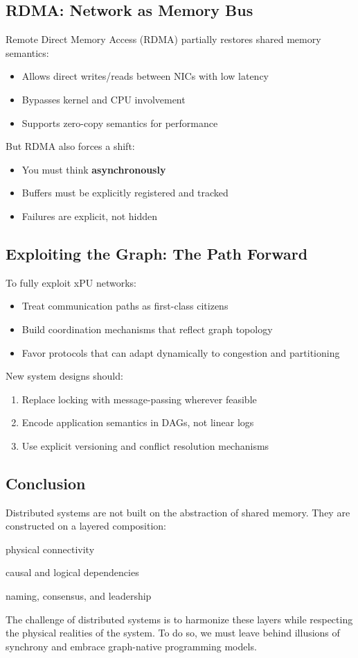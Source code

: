 \documentclass[../../../OAE-SPEC-MAIN.tex]{subfiles}
\begin{document}
\subsection*{RDMA: Network as Memory Bus}
Remote Direct Memory Access (RDMA) partially restores shared memory semantics:
\begin{itemize}[noitemsep]
  \item Allows direct writes/reads between NICs with low latency
  \item Bypasses kernel and CPU involvement
  \item Supports zero-copy semantics for performance
\end{itemize}

But RDMA also forces a shift:
\begin{itemize}[noitemsep]
  \item You must think \textbf{asynchronously}
  \item Buffers must be explicitly registered and tracked
  \item Failures are explicit, not hidden
\end{itemize}

\subsection{Exploiting the Graph: The Path Forward}
To fully exploit xPU networks:
\begin{itemize}
  \item Treat communication paths as first-class citizens
  \item Build coordination mechanisms that reflect graph topology
  \item Favor protocols that can adapt dynamically to congestion and partitioning
\end{itemize}

New system designs should:
\begin{enumerate}
  \item Replace locking with message-passing wherever feasible
  \item Encode application semantics in DAGs, not linear logs
  \item Use explicit versioning and conflict resolution mechanisms
\end{enumerate}

\subsection{Conclusion}
Distributed systems are not built on the abstraction of shared memory. They are constructed on a layered composition:
\begin{description}[style=unboxed,leftmargin=0cm]
  \item[Graphs:] physical connectivity
  \item[DAGs:] causal and logical dependencies
  \item[Trees:] naming, consensus, and leadership
\end{description}

The challenge of distributed systems is to harmonize these layers while respecting the physical realities of the system. To do so, we must leave behind illusions of synchrony and embrace graph-native programming models.
\end{document}
